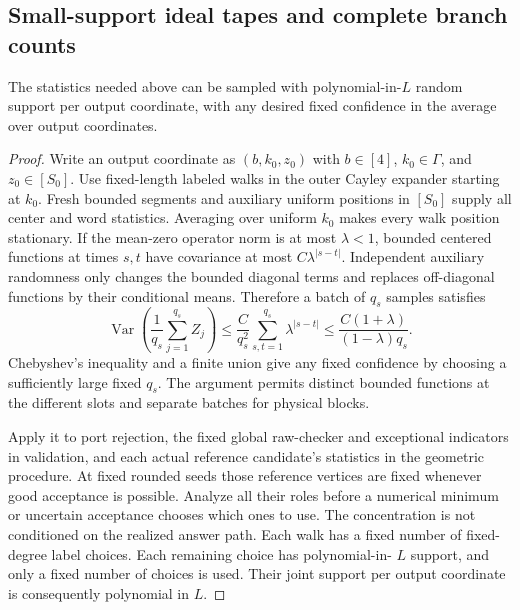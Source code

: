 \subsection{Small-support ideal tapes and complete branch counts}

\begin{lemma}\label{out:walk}
The statistics needed above can be sampled with polynomial-in-$L$
random support per output coordinate, with any desired fixed confidence
in the average over output coordinates.
\end{lemma}
\begin{proof}
Write an output coordinate as $(b,k_0,z_0)$ with $b\in[4]$,
$k_0\in\Gamma$, and $z_0\in[S_0]$. Use fixed-length labeled walks in the
outer Cayley expander starting at $k_0$. Fresh bounded segments and
auxiliary uniform positions in $[S_0]$ supply all center and word
statistics. Averaging over uniform $k_0$ makes every walk position
stationary. If the mean-zero operator norm is at most $\lambda<1$,
bounded centered functions at times $s,t$ have covariance at most
$C\lambda^{|s-t|}$. Independent auxiliary randomness only changes the
bounded diagonal terms and replaces off-diagonal functions by their
conditional means. Therefore a batch of $q_s$ samples satisfies
\[
 \operatorname{Var}\left(\frac1{q_s}\sum_{j=1}^{q_s} Z_j\right)
 \leq\frac{C}{q_s^2}\sum_{s,t=1}^{q_s}\lambda^{|s-t|}
 \leq\frac{C(1+\lambda)}{(1-\lambda)q_s}.
\]
Chebyshev's inequality and a finite union give any fixed confidence by
choosing a sufficiently large fixed $q_s$. The argument permits distinct
bounded functions at the different slots and separate batches for
physical blocks.

Apply it to port rejection, the fixed global raw-checker and exceptional
indicators in validation, and each actual reference candidate's
statistics in the geometric procedure. At fixed rounded seeds those
reference vertices are fixed whenever good acceptance is possible.
Analyze all their roles before a numerical minimum or uncertain
acceptance chooses which ones to use. The concentration is not
conditioned on the realized answer path. Each walk has a fixed number
of fixed-degree label choices. Each remaining choice has polynomial-in-
$L$ support, and only a fixed number of choices is used. Their joint
support per output coordinate is consequently polynomial in $L$.
\end{proof}

